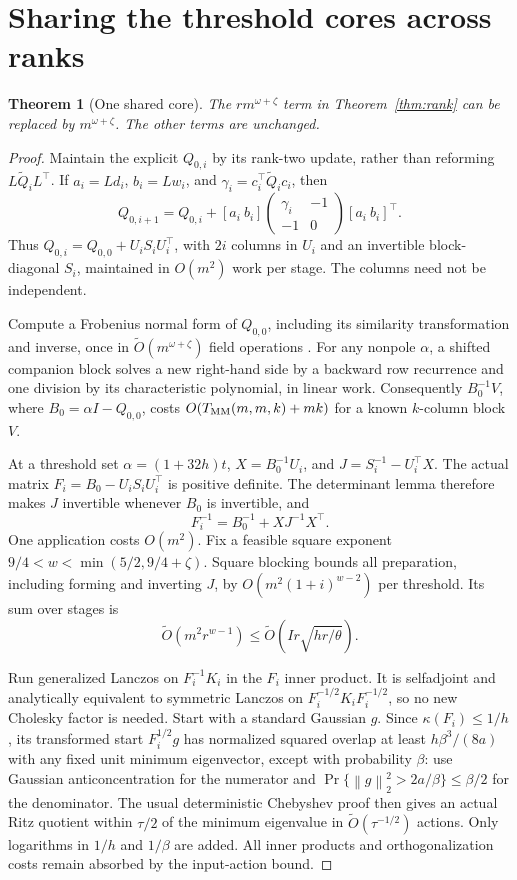 \documentclass[11pt]{article}
\newtheorem{theorem}{Theorem}
\newcommand{\norm}[1]{\left\lVert#1\right\rVert}
\newcommand{\MM}{T_{\rm MM}}
\begin{document}
\section{Sharing the threshold cores across ranks}
\begin{theorem}[One shared core]\label{thm:shared}
The \(r m^{\omega+\zeta}\) term in Theorem~\ref{thm:rank} can be
replaced by \(m^{\omega+\zeta}\). The other terms are unchanged.
\end{theorem}
\begin{proof}
Maintain the explicit \(Q_{0,i}\) by its rank-two update, rather than
reforming \(L\widetilde Q_iL^\top\). If \(a_i=Ld_i\),
\(b_i=Lw_i\), and \(\gamma_i=c_i^\top\widetilde Q_i c_i\), then
\[
 Q_{0,i+1}=Q_{0,i}+
 [a_i\ b_i]\begin{pmatrix}\gamma_i&-1\\-1&0\end{pmatrix}
 [a_i\ b_i]^\top .
\]
Thus \(Q_{0,i}=Q_{0,0}+U_i S_iU_i^\top\), with \(2i\) columns in
\(U_i\) and an invertible block-diagonal \(S_i\), maintained in
\(O(m^2)\) work per stage. The columns need not be independent.

Compute a Frobenius normal form of \(Q_{0,0}\), including its similarity
transformation and inverse, once in \(\widetilde O(m^{\omega+\zeta})\)
field operations \cite{npv}. For any nonpole \(\alpha\), a shifted
companion block solves a new right-hand side by a backward row recurrence
and one division by its characteristic polynomial, in linear work.
Consequently \(B_0^{-1}V\), where \(B_0=\alpha I-Q_{0,0}\), costs
\(O(\MM(m,m,k)+mk)\) for a known \(k\)-column block \(V\).

At a threshold set \(\alpha=(1+32h)t\), \(X=B_0^{-1}U_i\), and
\(J=S_i^{-1}-U_i^\top X\). The actual matrix
\(F_i=B_0-U_iS_iU_i^\top\) is positive definite. The determinant lemma
therefore makes \(J\) invertible whenever \(B_0\) is invertible, and
\[
 F_i^{-1}=B_0^{-1}+XJ^{-1}X^\top.
\]
One application costs \(O(m^2)\). Fix a feasible square exponent
\(9/4<w<\min(5/2,9/4+\zeta)\). Square blocking bounds all preparation,
including forming and inverting \(J\), by
\(O(m^2(1+i)^{w-2})\) per threshold. Its sum over stages is
\[
 \widetilde O(m^2r^{w-1})\leq
 \widetilde O(Ir\sqrt{hr/\theta}).
\]

Run generalized Lanczos on \(F_i^{-1}K_i\) in the \(F_i\) inner
product. It is selfadjoint and analytically equivalent to symmetric
Lanczos on \(F_i^{-1/2}K_iF_i^{-1/2}\), so no new Cholesky factor is
needed. Start with a standard Gaussian \(g\). Since
\(\kappa(F_i)\leq1/h\), its transformed start \(F_i^{1/2}g\)
has normalized squared overlap at least \(h\beta^3/(8a)\) with any fixed unit
minimum eigenvector, except with probability \(\beta\):
use Gaussian anticoncentration for the numerator and
\(\Pr\{\norm g_2^2>2a/\beta\}\leq\beta/2\) for the denominator.
The usual deterministic Chebyshev proof then gives an actual Ritz
quotient within \(\tau/2\) of the minimum eigenvalue in
\(\widetilde O(\tau^{-1/2})\) actions. Only logarithms in \(1/h\)
and \(1/\beta\) are added. All inner products and orthogonalization
costs remain absorbed by the input-action bound.


\end{proof}
\end{document}
